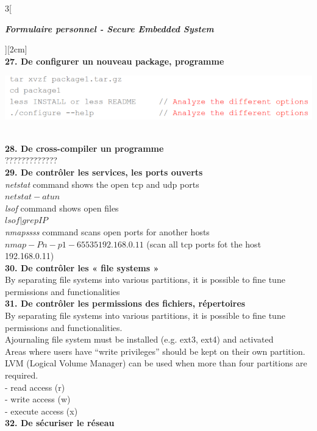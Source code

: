 \begin{multicols}{3}[\centerline{ \large\em \textbf{Formulaire personnel - Secure Embedded System}}][2cm]
\\ \textbf{27. De configurer un nouveau package, programme\\}
\begin{minipage}{\linewidth}
	\centering
    \includegraphics[width =0.8\columnwidth]{images/17.png}
\end{minipage}
\\ \textbf{28. De cross-compiler un programme\\}
?????????????
\\ \textbf{29. De contrôler les services, les ports ouverts\\}
\textit{netstat} command shows the open tcp and udp ports\\
$netstat -atun$\\
\textit{lsof} command shows open files\\
$ lsof | grep IP$\\
\textit{nmapssss} command scans open ports for another hosts\\
$nmap -Pn -p 1-65535 192.168.0.11$ (scan all tcp ports fot the host 192.168.0.11)
\\ \textbf{30. De contrôler les « file systems »\\}
By separating file systems into various partitions, it is possible to fine tune permissions and functionalities
\\ \textbf{31. De contrôler les permissions des fichiers, répertoires\\}
By separating file systems into various partitions, it is possible to fine tune permissions and functionalities.\\
Ajournaling file system must be installed (e.g. ext3, ext4) and activated\\
Areas where users have “write privileges” should be kept on their own partition.\\
LVM (Logical Volume Manager) can be used when more than four partitions are required.\\
- read access (r)\\
- write access (w)\\
- execute access (x)
\\ \textbf{32. De sécuriser le réseau\\}

\end{multicols}
